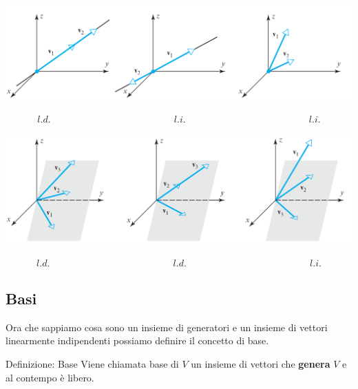 \documentclass[x11names]{article}
\begin{document}
\begin{center}
\includegraphics[scale=0.22]{figures/linind.png}
\end{center}
$$
\begin{array}{ccc}
	l.d.\qquad \qquad \qquad \qquad \qquad \qquad& l.i. & \qquad \qquad \qquad \qquad \qquad \qquad l.i. 
\end{array}
$$ 
\begin{center}
\includegraphics[scale=0.22]{figures/linind2.png}
\end{center}
$$
\begin{array}{ccc}
	l.d.\qquad \qquad \qquad \qquad \qquad \qquad& l.d. & \qquad \qquad \qquad \qquad \qquad \qquad l.i. 
\end{array}
$$

\subsection{Basi}
Ora che sappiamo cosa sono un insieme di generatori e un insieme di vettori linearmente indipendenti possiamo definire il concetto di base.


\begin{center}
\colorbox{myblue}{\begin{minipage}{5.75in}
\begin{blues}{Definizione: Base}
Viene chiamata base di $V$ un insieme di vettori che \textbf{genera} $V$ e al contempo è libero.
\end{blues}
\end{minipage}}        
\end{center}
\end{document}
